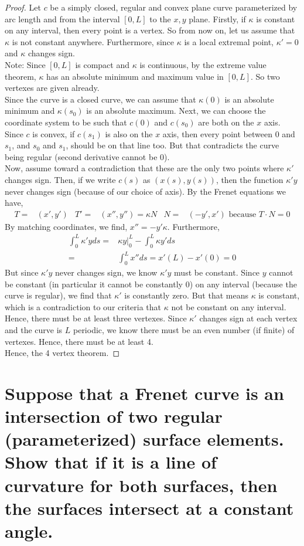 \documentclass[12pt]{amsart}
\begin{document}
\begin{proof}
	Let $c$ be a simply closed, regular and convex plane curve parameterized by arc length and from the interval $[0,L]$ to the $x,y$ plane. Firstly, if $\kappa$ is constant on any interval, then every point is a vertex. So from now on, let us assume that $\kappa$ is not constant anywhere. Furthermore, since $\kappa$ is a local extremal point, $\kappa'=0$ and $\kappa$ changes sign.
	\\Note: Since $[0,L]$ is compact and $\kappa$ is continuous, by the extreme value theorem, $\kappa$ has an absolute minimum and maximum value in $[0,L]$. So two vertexes are given already.
	\\Since the curve is a closed curve, we can assume that $\kappa(0)$ is an absolute minimum and $\kappa(s_0)$ is an absolute maximum. Next, we can choose the coordinate system to be such that $c(0)$ and $c(s_0)$ are both on the $x$ axis. Since $c$ is convex, if $c(s_1)$ is also on the $x$ axis, then every point between $0$ and $s_1$, and $s_0$ and $s_1$, should be on that line too. But that contradicts the curve being regular (second derivative cannot be 0).
	\\Now, assume toward a contradiction that these are the only two points where $\kappa'$ changes sign. Then, if we write $c(s)$ as $(x(s),y(s))$, then the function $\kappa'y$ never changes sign (because of our choice of axis). By the Frenet equations we have,
	\begin{align*}
		T=&(x',y') & T'=&(x'',y'')=\kappa N & N=&(-y',x')\text{ because $T\cdot N=0$}
	\end{align*}
	By matching coordinates, we find, $x''=-y'\kappa$. Furthermore,
	\begin{align*}
		\int_0^L\kappa'yds=&\kappa y|_0^L-\int_0^L\kappa y'ds
		\\=&\int_0^Lx''ds=x'(L)-x'(0)=0
	\end{align*}
	But since $\kappa'y$ never changes sign, we know $\kappa'y$ must be constant. Since $y$ cannot be constant (in particular it cannot be constantly 0) on any interval (because the curve is regular), we find that $\kappa'$ is constantly zero. But that means $\kappa$ is constant, which is a contradiction to our criteria that $\kappa$ not be constant on any interval.
	\\Hence, there must be at least three vertexes. Since $\kappa'$ changes sign at each vertex and the curve is $L$ periodic, we know there must be an even number (if finite) of vertexes. Hence, there must be at least 4.
	\\Hence, the 4 vertex theorem.
\end{proof}

\newpage
\section{Suppose that a Frenet curve is an intersection of two regular (parameterized) surface elements. Show that if it is a line of curvature for both surfaces, then the surfaces intersect at a constant angle.}
\end{document}
